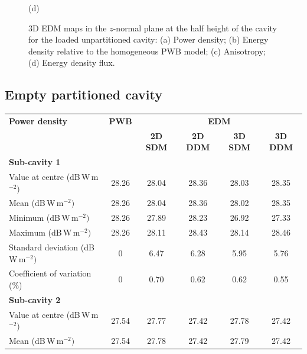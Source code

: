 \documentclass[a4paper]{article}
\numberwithin{equation}{section}
\begin{document}
\begin{figure}[ht]
\begin{center}
{\footnotesize (d)}\\
\vspace{-2mm}
\caption{\label{fg:unpartcyl_maps} 3D EDM maps in the $z$-normal plane at the half height of the cavity for the 
loaded unpartitioned cavity: (a) Power density; (b) Energy density relative to the homogeneous PWB model;
(c) Anisotropy; (d) Energy density flux.}
\end{center}
\end{figure}

\subsection[Empty partitioned cavity]{Empty partitioned cavity}
\label{sc:res:emptypart}

\begin{table}[ht]
\begin{center}
\begin{tabular}{|l|c|c|c|c|c|}
\hline
\textbf{Power density}               &\textbf{PWB} &\multicolumn{4}{|c|}{\textbf{EDM}} \\ \cline{3-6}
{}                                   &{}           &\textbf{2D SDM} &\textbf{2D DDM} &\textbf{3D SDM} &\textbf{3D DDM} \\
\hline
\multicolumn{6}{|l|}{\textbf{Sub-cavity 1}} \\
\hline
Value at centre (dB\,W\,m$^{-2})$    &28.26        &28.04           &28.36           &28.03           &28.35 \\
Mean (dB\,W\,m$^{-2})$               &28.26        &28.04           &28.36           &28.02           &28.35 \\
Minimum (dB\,W\,m$^{-2})$            &28.26        &27.89           &28.23           &26.92           &27.33 \\
Maximum (dB\,W\,m$^{-2})$            &28.26        &28.11           &28.43           &28.14           &28.46 \\
Standard deviation (dB\,W\,m$^{-2})$ &0            &6.47            &6.28            &5.95            &5.76  \\
Coefficient of variation (\%)        &0            &0.70            &0.62            &0.62            &0.55  \\
\hline
\multicolumn{6}{|l|}{\textbf{Sub-cavity 2}} \\
\hline
Value at centre (dB\,W\,m$^{-2})$    &27.54        &27.77           &27.42           &27.78           &27.42 \\
Mean (dB\,W\,m$^{-2})$               &27.54        &27.78           &27.42           &27.79           &27.42 \\

\end{tabular}
\end{center}
\end{table}
\end{document}
